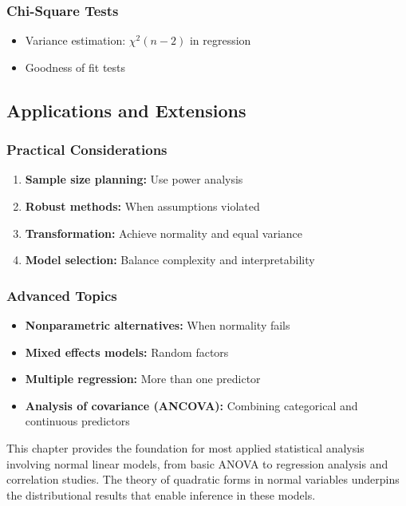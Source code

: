 \subsubsection{Chi-Square Tests}

\begin{itemize}
	\item Variance estimation: $\chi^2(n-2)$ in regression
	\item Goodness of fit tests
\end{itemize}

\subsection{Applications and Extensions}

\subsubsection{Practical Considerations}

\begin{enumerate}
	\item \textbf{Sample size planning:} Use power analysis
	\item \textbf{Robust methods:} When assumptions violated
	\item \textbf{Transformation:} Achieve normality and equal variance
	\item \textbf{Model selection:} Balance complexity and interpretability
\end{enumerate}

\subsubsection{Advanced Topics}

\begin{itemize}
	\item \textbf{Nonparametric alternatives:} When normality fails
	\item \textbf{Mixed effects models:} Random factors
	\item \textbf{Multiple regression:} More than one predictor
	\item \textbf{Analysis of covariance (ANCOVA):} Combining categorical and continuous predictors
\end{itemize}

This chapter provides the foundation for most applied statistical analysis involving normal linear models, from basic ANOVA to regression analysis and correlation studies. The theory of quadratic forms in normal variables underpins the distributional results that enable inference in these models.
